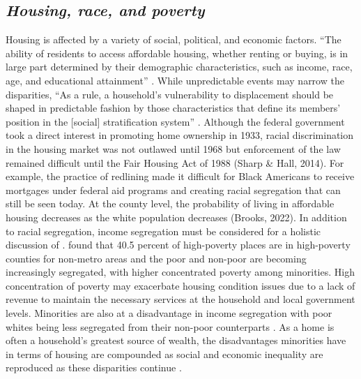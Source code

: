 \subsection{\textit{Housing, race, and poverty}}
Housing is affected by a variety of social, political, and economic factors. “The ability of residents to access affordable housing, whether renting or buying, is in large part determined by their demographic characteristics, such as income, race, age, and educational attainment” \citep[115]{yadavalli_comprehensive_2023}. While unpredictable events may narrow the disparities, “As a rule, a household’s vulnerability to displacement should be shaped in predictable fashion by those characteristics that define its members’ position in the [social] stratification system” \citep[5]{lee_forced_2020}. Although the federal government took a direct interest in promoting home ownership in 1933, racial discrimination in the housing market was not outlawed until 1968 but enforcement of the law remained difficult until the Fair Housing Act of 1988 (Sharp \& Hall, 2014). For example, the practice of redlining made it difficult for Black Americans to receive mortgages under federal aid programs and creating racial segregation that can still be seen today. At the county level, the probability of living in affordable housing decreases as the white population decreases (Brooks, 2022). In addition to racial segregation, income segregation must be considered for a holistic discussion of \hs. \citet{lichter_rural_2011} found that 40.5 percent of high-poverty places are in high-poverty counties for non-metro areas and the poor and non-poor are becoming increasingly segregated, with higher concentrated poverty among minorities. High concentration of poverty may exacerbate housing condition issues due to a lack of revenue to maintain the necessary services at the household and local government levels. Minorities are also at a disadvantage in income segregation with poor whites being less segregated from their non-poor counterparts \citep{lichter_ruralurban_2021}. As a home is often a household's greatest source of wealth, the disadvantages minorities have in terms of housing are compounded as social and economic inequality are reproduced as these disparities continue \citep{krivo_housing_2004}.  

